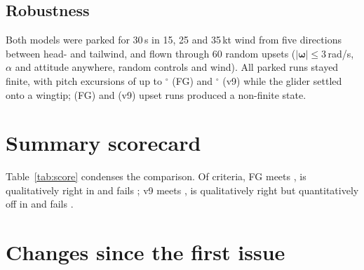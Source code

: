 \documentclass[10pt,a4paper,twocolumn]{article}
\newcommand{\vnine}{v9}
\newcommand{\FG}{FG}
\newcommand{\ok}{\textcolor{green!45!black}{\ensuremath{\checkmark}}}
\newcommand{\nok}{\textcolor{red!70!black}{\ensuremath{\times}}}
\newcommand{\pok}{\textcolor{orange!85!black}{\ensuremath{\sim}}}
\begin{document}
\subsection{Robustness}
Both models were parked for 30\,s in 15, 25 and 35\,kt wind from five directions between head- and tailwind, and flown through
60 random upsets ($|\boldsymbol\omega|\le3$\,rad/s, $\alpha$ and attitude anywhere, random controls and wind). All parked runs stayed
finite, with pitch excursions of up to \NwindDthFg$^\circ$ (\FG) and \NwindDthNine$^\circ$ (\vnine) while the glider settled onto a wingtip;
\NfuzzBadFg{} (\FG) and \NfuzzBadNine{} (\vnine) upset runs produced a non-finite state.

\section{Summary scorecard}
\begin{table}[t]
\centering\small
\caption{Behaviour against the sources. \ok\ within the reported range or tolerance; \pok\ qualitatively right, quantitatively off; \nok\ wrong or absent.}
\label{tab:score}

\end{table}
Table~\ref{tab:score} condenses the comparison. Of \NscN{} criteria, \FG{} meets \NscOkFg, is qualitatively right in \NscPkFg{} and
fails \NscNoFg; \vnine{} meets \NscOkNine, is qualitatively right but quantitatively off in \NscPkNine{} and fails \NscNoNine.

\section{Changes since the first issue}\label{sec:review}
\end{document}
